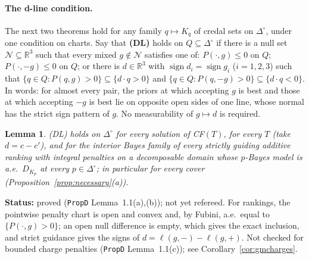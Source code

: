 \documentclass[11pt]{article}
\newtheorem{lemma}[theorem]{Lemma}
\theoremstyle{definition}
\theoremstyle{remark}
\newcommand{\R}{\mathbb R}
\newcommand{\Di}{\Delta^{\circ}}
\newcommand{\src}[1]{\texttt{#1}}
\newcommand{\status}[1]{\par\smallskip\noindent\textbf{Status:} #1\par\smallskip}
\begin{document}
\paragraph{The d-line condition.} The next two theorems hold for any family $q\mapsto K_q$ of credal sets on $\Di$, under one condition on charts. Say that \textbf{(DL)} holds on $Q\subseteq\Di$ if there is a null set $\mathcal N\subseteq\R^3$ such that every mixed $g\notin\mathcal N$ satisfies one of: $P(\cdot,g)\le0$ on $Q$; $P(\cdot,-g)\le0$ on $Q$; or there is $d\in\R^3$ with $\operatorname{sign}d_i=\operatorname{sign}g_i$ ($i=1,2,3$) such that $\{q\in Q:P(q,g)>0\}\subseteq\{d\cdot q>0\}$ and $\{q\in Q:P(q,-g)>0\}\subseteq\{d\cdot q<0\}$. In words: for almost every pair, the priors at which accepting $g$ is best and those at which accepting $-g$ is best lie on opposite open sides of one line, whose normal has the strict sign pattern of $g$. No measurability of $g\mapsto d$ is required.

\begin{lemma}\label{lem:DLholds}
(DL) holds on $\Di$ for every solution of CF$(T)$, for every $T$ (take $d=c-c'$), and for the interior Bayes family of every strictly guiding additive ranking with integral penalties on a decomposable domain whose $p$-Bayes model is a.e.\ $D_{K_p}$ at every $p\in\Di$; in particular for every cover (Proposition~\ref{prop:necessary}(a)).
\end{lemma}
\status{proved (\src{PropD} Lemma~1.1(a),(b)); not yet refereed. For rankings, the pointwise penalty chart is open and convex and, by Fubini, a.e.\ equal to $\{P(\cdot,g)>0\}$; an open null difference is empty, which gives the exact inclusion, and strict guidance gives the signs of $d=\ell(g,-)-\ell(g,+)$. Not checked for bounded charge penalties (\src{PropD} Lemma~1.1(c)); see Corollary~\ref{cor:gmcharges}.}
\end{document}
